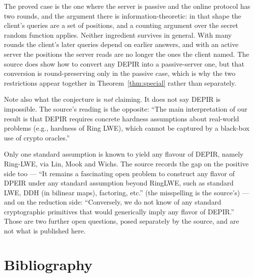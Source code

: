 \documentclass{aicr-conjecture}
\begin{document}
\begin{remark}\label{rem:obstruction}
The proved case is the one where the server is passive and the online
protocol has two rounds, and the argument there is information-theoretic:
in that shape the client's queries are a set of positions, and a
counting argument over the secret random function applies. Neither
ingredient survives in general. With many rounds the client's later
queries depend on earlier answers, and with an active server the
positions the server reads are no longer the ones the client named. The
source does show how to convert any DEPIR into a passive-server one, but
that conversion is round-preserving only in the passive case, which is
why the two restrictions appear together in Theorem~\ref{thm:special}
rather than separately.

Note also what the conjecture is \emph{not} claiming. It does not say
DEPIR is impossible. The source's reading is the opposite: ``The main
interpretation of our result is that DEPIR requires concrete hardness
assumptions about real-world problems (e.g., hardness of Ring LWE), which
cannot be captured by a black-box use of crypto oracles.''
\end{remark}

\begin{remark}\label{rem:context}
Only one standard assumption is known to yield any flavour of DEPIR,
namely Ring-LWE, via Lin, Mook and Wichs. The source records the gap on the
positive side too --- ``It remains a fascinating open problem to construct
any flavor of DPEIR under any standard assumption beyond RingLWE, such as
standard LWE, DDH (in bilinear maps), factoring, etc.'' (the misspelling
is the source's) --- and on the reduction side: ``Conversely, we do not
know of any standard cryptographic primitives that would generically
imply any flavor of DEPIR.'' Those are two further open questions, posed
separately by the source, and are not what is published here.
\end{remark}

\section{Bibliography}
\end{document}
